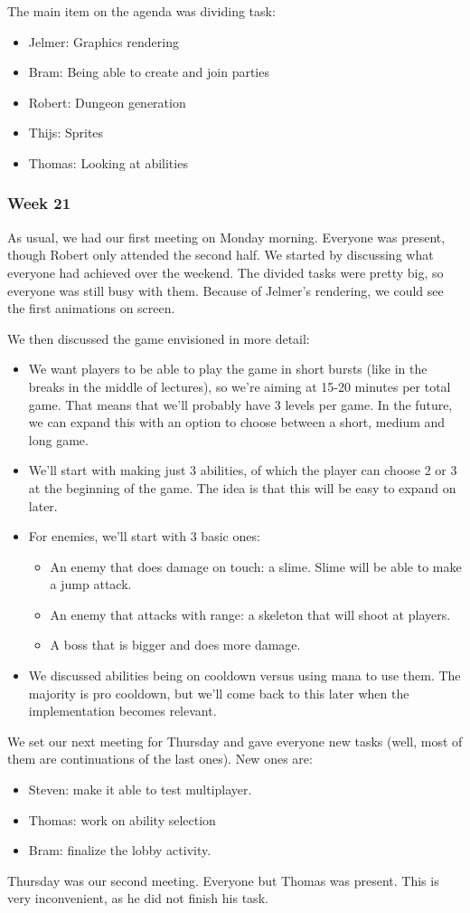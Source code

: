 \documentclass[../main.tex]{subfiles}
\begin{document}
The main item on the agenda was dividing task:
\begin{itemize}
	\item Jelmer: Graphics rendering
	\item Bram: Being able to create and join parties
	\item Robert: Dungeon generation
	\item Thijs: Sprites
	\item Thomas: Looking at abilities
\end{itemize}

\subsubsection*{Week 21}
As usual, we had our first meeting on Monday morning. Everyone was present, though Robert only attended the second half. We started by discussing what everyone had achieved over the weekend. The divided tasks were pretty big, so everyone was still busy with them. Because of Jelmer's rendering, we could see the first animations on screen. 

We then discussed the game envisioned in more detail:
\begin{itemize}
	\item We want players to be able to play the game in short bursts (like in the breaks in the middle of lectures), so we're aiming at 15-20 minutes per total game. That means that we'll probably have 3 levels per game. In the future, we can expand this with an option to choose between a short, medium and long game.
	\item We'll start with making just 3 abilities, of which the player can choose 2 or 3 at the beginning of the game. The idea is that this will be easy to expand on later.
	\item For enemies, we'll start with 3 basic ones:
	\begin{itemize}
		\item An enemy that does damage on touch: a slime. Slime will be able to make a jump attack.
		\item An enemy that attacks with range: a skeleton that will shoot at players.
		\item A boss that is bigger and does more damage.
	\end{itemize}
	\item We discussed abilities being on cooldown versus using mana to use them. The majority is pro cooldown, but we'll come back to this later when the implementation becomes relevant.
\end{itemize}
We set our next meeting for Thursday and gave everyone new tasks (well, most of them are continuations of the last ones). New ones are:
\begin{itemize}
	\item Steven: make it able to test multiplayer.
	\item Thomas: work on ability selection
	\item Bram: finalize the lobby activity.
\end{itemize}
\bigbreak\noindent
Thursday was our second meeting. Everyone but Thomas was present. This is very inconvenient, as he did not finish his task.
\end{document}
